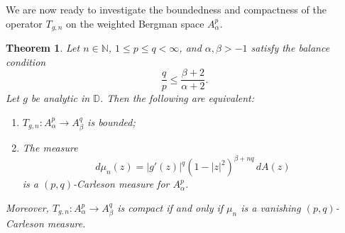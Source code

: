 \documentclass[preprint,12pt]{elsarticle}
\numberwithin{equation}{section}
\newtheorem{theorem}{Theorem}[section]
\theoremstyle{remark}
\begin{document}
We are now ready to investigate the boundedness and compactness of the operator $T_{g,n}$ on the weighted Bergman space $A^p_\alpha$.

\begin{theorem}
\label{thm:bergman-boundedness}
Let $n \in \mathbb{N}$, $1 \le p \le q < \infty$, and $ \alpha, \beta > -1 $ satisfy the balance condition
\begin{equation}\label{eq:balance}
\frac{q}{p} \le \frac{\beta + 2}{\alpha + 2}.
\end{equation}
Let $ g $ be analytic in $ \mathbb{D} $.
Then the following are equivalent:
\begin{enumerate}
\item[(i)] $ T_{g,n}: A_\alpha^p \to A_\beta^q $ is bounded;
\item[(ii)] The measure
\begin{equation*}
d\mu_n(z) = |g'(z)|^q (1 - |z|^2)^{\beta + nq} \, dA(z)
\end{equation*}
is a $(p,q)$-Carleson measure for $ A_\alpha^p $.
\end{enumerate}
Moreover, $ T_{g,n}: A_\alpha^p \to A_\beta^q $ is compact if and only if $ \mu_n $ is a vanishing $(p,q)$-Carleson measure.
\end{theorem}
\end{document}
